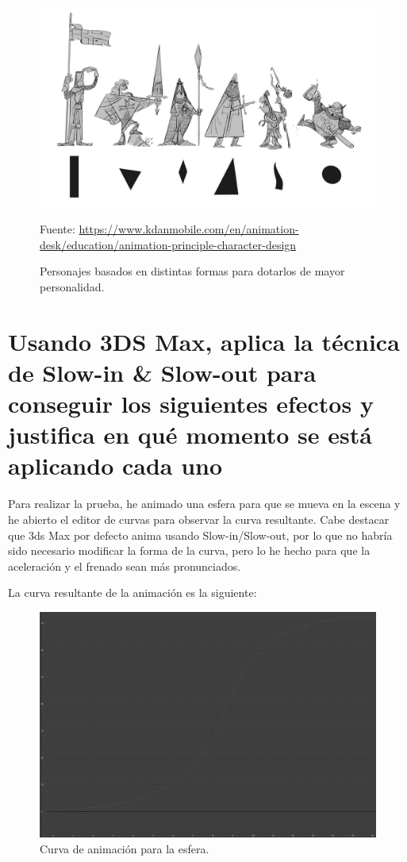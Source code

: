 \documentclass{article}
\begin{document}
\begin{figure}[H]
    \centering
    \includegraphics[width=\textwidth]{imagenes/appeal.jpg}
    \caption{Personajes basados en distintas formas para dotarlos de mayor personalidad.}
    \vspace{10pt}
    \footnotesize{Fuente: \url{https://www.kdanmobile.com/en/animation-desk/education/animation-principle-character-design}}
\end{figure}

\section{Usando 3DS Max, aplica la técnica de Slow-in \& Slow-out para conseguir los siguientes efectos y justifica en qué momento se está aplicando cada uno}

Para realizar la prueba, he animado una esfera para que se mueva en la escena y he abierto el editor de curvas para observar la curva resultante. Cabe destacar que 3ds Max por defecto anima usando Slow-in/Slow-out, por lo que no habría sido necesario modificar la forma de la curva, pero lo he hecho para que la aceleración y el frenado sean más pronunciados.

\bigskip

La curva resultante de la animación es la siguiente:

\begin{figure}[H]
    \centering
    \includegraphics[width=\textwidth]{imagenes/curva.png}
    \caption{Curva de animación para la esfera.}
\end{figure}
\end{document}
